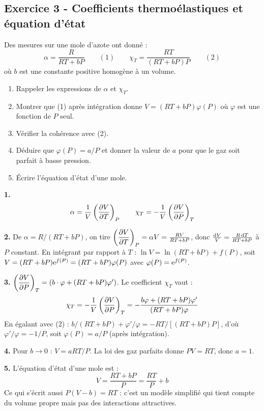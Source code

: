 \documentclass[12pt,a4paper]{article}
\begin{document}
\subsection*{Exercice 3 - Coefficients thermoélastiques et équation d'état \niveau{\difficile}}

\begin{boiteexercice}
Des mesures sur une mole d'azote ont donné :
\[
\alpha = \frac{R}{RT+bP} \qquad (1) \qquad \chi_T = \frac{RT}{(RT+bP)P} \qquad (2)
\]
où $b$ est une constante positive homogène à un volume.

\begin{enumerate}
  \item Rappeler les expressions de $\alpha$ et $\chi_T$.
  \item Montrer que (1) après intégration donne $V = (RT+bP)\varphi(P)$ où $\varphi$ est une fonction de $P$ seul.
  \item Vérifier la cohérence avec (2).
  \item Déduire que $\varphi(P) = a/P$ et donner la valeur de $a$ pour que le gaz soit parfait à basse pression.
  \item Écrire l'équation d'état d'une mole.
\end{enumerate}
\end{boiteexercice}

\begin{boitecorrige}
\textbf{1.}
\[
\alpha = \frac{1}{V}\left(\dfrac{\partial V}{\partial T}\right)_P \qquad \chi_T = -\frac{1}{V}\left(\dfrac{\partial V}{\partial P}\right)_T
\]

\textbf{2.} De $\alpha = R/(RT+bP)$, on tire $\left(\dfrac{\partial V}{\partial T}\right)_P = \alpha V = \frac{RV}{RT+bP}$, donc $\frac{\mathrm{d} V}{V} = \frac{R\,\mathrm{d} T}{RT+bP}$ à $P$ constant. En intégrant par rapport à $T$ : $\ln V = \ln(RT+bP) + f(P)$, soit $V = (RT+bP)\mathrm{e}^{f(P)} = (RT+bP)\varphi(P)$ avec $\varphi(P) = \mathrm{e}^{f(P)}$.

\textbf{3.} $\left(\dfrac{\partial V}{\partial P}\right)_T = (b\cdot\varphi + (RT+bP)\varphi')$. Le coefficient $\chi_T$ vaut :
\[
\chi_T = -\frac{1}{V}\left(\dfrac{\partial V}{\partial P}\right)_T = -\frac{b\varphi + (RT+bP)\varphi'}{(RT+bP)\varphi}
\]
En égalant avec (2) : $b/(RT+bP) + \varphi'/\varphi = -RT/[(RT+bP)P]$, d'où $\varphi'/\varphi = -1/P$, soit $\varphi(P) = a/P$ (après intégration).

\textbf{4.} Pour $b\to0$ : $V = aRT/P$. La loi des gaz parfaits donne $PV = RT$, donc $a = 1$.

\textbf{5.} L'équation d'état d'une mole est :
\[
\boxed{V = \frac{RT+bP}{P} = \frac{RT}{P} + b}
\]
Ce qui s'écrit aussi $P(V-b) = RT$ : c'est un modèle simplifié qui tient compte du volume propre mais pas des interactions attractives.
\end{boitecorrige}
\end{document}
